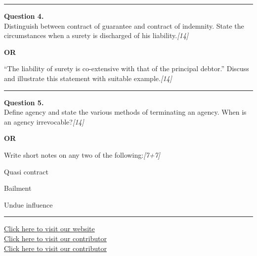 \documentclass[11pt,a4paper]{article}
\newcommand{\pts}[1]{\hfill   \textit{[#1]}}
\begin{document}
\medskip\rule{\linewidth}{0.2pt}




\noindent   \textbf{Question 4.} \\
Distinguish between contract of guarantee and contract of indemnity. State the circumstances when a surety is discharged of his liability.\pts{14}

\centerline{   \textbf{OR}}

``The liability of surety is co-extensive with that of the principal debtor.'' Discuss and illustrate this statement with suitable example.\pts{14}

\medskip\rule{\linewidth}{0.2pt}




\noindent   \textbf{Question 5.} \\
Define agency and state the various methods of terminating an agency. When is an agency irrevocable?\pts{14}

\centerline{   \textbf{OR}}

Write short notes on any two of the following:\pts{7+7}

\begin{parts}
  \item Quasi contract
  \item Bailment
  \item Undue influence
\end{parts}

\vfill
\rule{\linewidth}{0.4pt}

\begin{center}\small
  \href{https://bhu-exam.vercel.app/}{Click here to visit our website}\\[4pt]
  \href{https://me-aryan.vercel.app/}{Click here to visit our contributor}\\[4pt]
  \href{https://quashan-me.vercel.app/}{Click here to visit our contributor}
\end{center}
\end{document}

